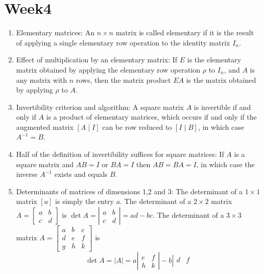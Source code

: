 \documentclass{article}
\begin{document}
\newpage

\section{Week4}

\begin{enumerate}
    \item Elementary matrices: An $n \times n$ matrix is called elementary if it is the result of applying a single elementary row operation to the identity matrix $I_{n}$.
    \item Effect of multiplication by an elementary matrix: If $E$ is the elementary matrix obtained by applying the elementary row operation $\rho$ to $I_{n}$, and $A$ is any matrix with $n$ rows, then the matrix product $E A$ is the matrix obtained by applying $\rho$ to $A$.
    \item Invertibility criterion and algorithm: A square matrix $A$ is invertible if and only if $A$ is a product of elementary matrices, which occurs if and only if the augmented matrix $[A \mid I]$ can be row reduced to $[I \mid B]$, in which case $A^{-1}=B$.
    \item Half of the definition of invertibility suffices for square matrices: If $A$ is a square matrix and $A B=I$ or $B A=I$ then $A B=B A=I$, in which case the inverse $A^{-1}$ exists and equals $B$.
    \item Determinants of matrices of dimensions 1,2 and 3: The determinant of a $1 \times 1$ matrix $[a]$ is simply the entry $a$. The determinant of a $2 \times 2$ matrix $A=\left[\begin{array}{cc}a & b \\ c & d\end{array}\right]$ is $\det A=\left|\begin{array}{cc}a & b \\ c & d\end{array}\right|=a d-b c$. The determinant of a $3 \times 3$ matrix $A=\left[\begin{array}{ccc}a & b & c \\ d & e & f \\ g & h & k\end{array}\right]$ is
    \[
    \det A=|A|=a\left|\begin{array}{cc}
    e & f \\
    h & k
    \end{array}\right|-b\left|\begin{array}{cc}
    d & f \\

\end{array}\]
\end{enumerate}
\end{document}

